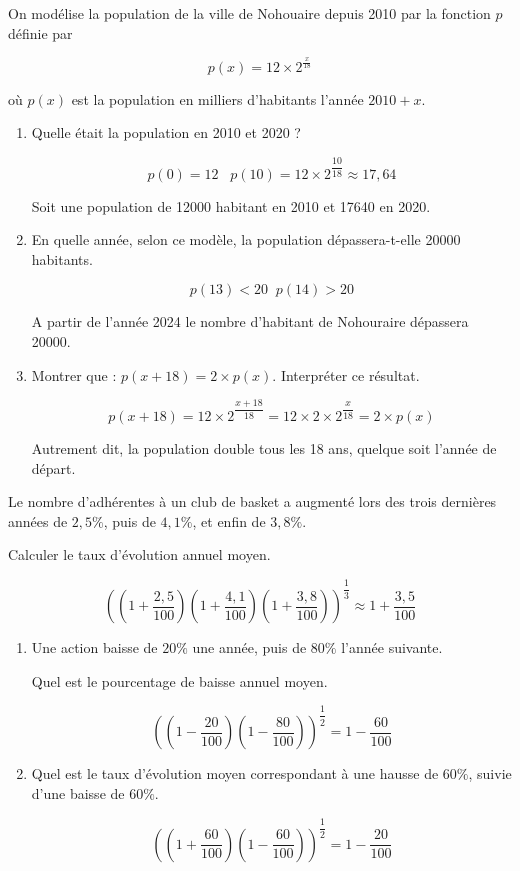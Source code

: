 \documentclass[french]{book}
\begin{document}
\begin{corrige}
On modélise la population de la ville de Nohouaire depuis 2010 par la fonction $p$ définie par

$$
p(x)=12 \times 2^{\frac{x}{18}}
$$

où $p(x)$ est la population en milliers d'habitants l'année $2010+x$.

\begin{enumerate}
\item Quelle était la population en 2010 et 2020 ?

$$p(0)=12 \;\;\; p(10)=12 \times 2^\dfrac{10}{18}\approx 17,64$$

Soit une population de 12000 habitant en 2010 et 17640  en 2020.

\item En quelle année, selon ce modèle, la population dépassera-t-elle 20000 habitants.

$$p(13)<20 \;\; p(14)>20$$

A partir de l'année 2024 le nombre d'habitant de Nohouraire dépassera 20000.
 

\item Montrer que : $p(x+18)=2 \times p(x)$. Interpréter ce résultat.

$$p(x+18)=12 \times 2^{\dfrac{x+18}{18}} = 12 \times 2 \times 2^\dfrac{x}{18}= 2\times p(x)$$

Autrement dit, la population double tous les 18 ans, quelque soit l'année de départ.
\end{enumerate}
\end{corrige}

\begin{corrige}

Le nombre d'adhérentes à un club de basket a augmenté lors des trois dernières années de $2,5 \%$, puis de $4,1 \%$, et enfin de $3,8 \%$.

Calculer le taux d'évolution annuel moyen.

$$((1+\dfrac{2,5}{100})(1+\dfrac{4,1}{100})(1+\dfrac{3,8}{100}))^{\dfrac{1}{3}}  \approx 1+\dfrac{3,5}{100}$$

\end{corrige}

\begin{corrige}
\begin{enumerate}
\item Une action baisse de $20 \%$ une année, puis de $80 \%$ l'année suivante.

Quel est le pourcentage de baisse annuel moyen.

$$((1-\dfrac{20}{100})(1-\dfrac{80}{100}))^{\dfrac{1}{2}} = 1 -\dfrac{60}{100}$$

\item Quel est le taux d'évolution moyen correspondant à une hausse de $60 \%$, suivie d'une baisse de $60 \%$.

$$((1+\dfrac{60}{100})(1-\dfrac{60}{100}))^{\dfrac{1}{2}}=1-\dfrac{20}{100}$$
\end{enumerate}
\end{corrige}
\end{document}
